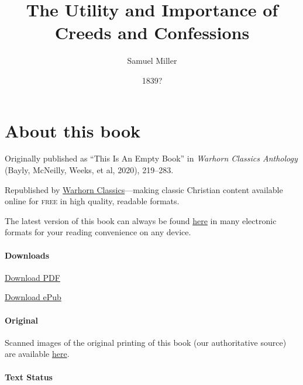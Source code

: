 \documentclass[
]{book}
\title{The Utility and Importance of Creeds and Confessions}
\author{Samuel Miller}
\date{1839?}
\begin{document}
\maketitle

\mainmatter
{}

{
\setcounter{tocdepth}{1}
\tableofcontents
}
\hypertarget{about-this-book}{%
\chapter*{About this book}\label{about-this-book}}

Originally published as ``This Is An Empty Book'' in \emph{Warhorn Classics Anthology} (Bayly, McNeilly, Weeks, et al, 2020), 219--283.

Republished by \href{https://classics.warhornmedia.com/}{Warhorn Classics}---making classic Christian content available online for \textsc{free} in high quality, readable formats.

The latest version of this book can always be found \href{https://warhornmedia.github.io/miller-creeds-and-confessions/}{here} in many electronic formats for your reading convenience on any device.

\hypertarget{downloads}{%
\subsubsection*{Downloads}\label{downloads}}

\href{https://warhornmedia.github.io/miller-creeds-and-confessions//Miller-Creeds_and_Confessions.pdf}{Download PDF}

\href{https://warhornmedia.github.io/miller-creeds-and-confessions//Miller-Creeds_and_Confessions.epub}{Download ePub}

\hypertarget{original}{%
\subsubsection*{Original}\label{original}}

Scanned images of the original printing of this book (our authoritative source) are available \href{https://archive.org/details/utilityimportanc00milluoft/page/n3/mode/2up}{here}.

\hypertarget{text-status}{%
\subsubsection*{Text Status}\label{text-status}}
\end{document}
